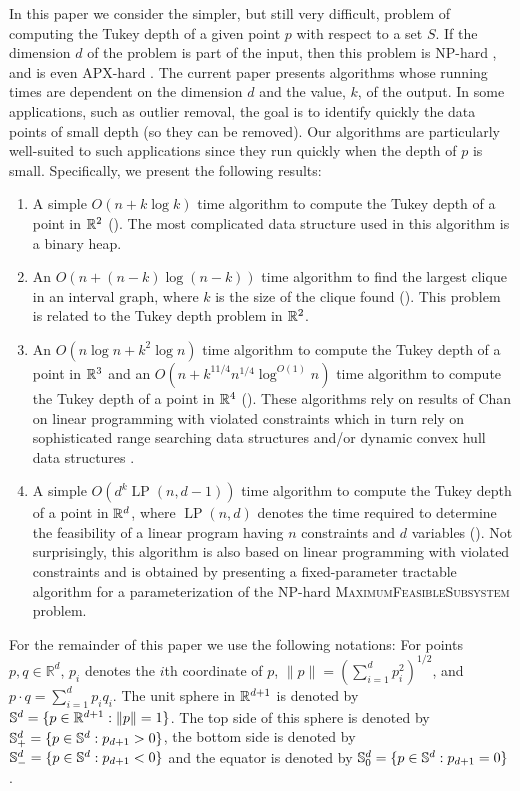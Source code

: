 \documentclass[charterfonts,lotsofwhite]{patmorin}
\DeclareMathOperator{\lp}{LP}
\begin{document}
In this paper we consider the simpler, but still very difficult,
problem of computing the Tukey depth of a given point $p$ with respect
to a set $S$. If the dimension $d$ of the problem is part of the
input, then this problem is NP-hard \cite{jp78}, and is even APX-hard
\cite{ak95}.  The current paper presents algorithms whose running
times are dependent on the dimension $d$ and the value, $k$, of the
output.  In some applications, such as outlier removal, the goal is to
identify quickly the data points of small depth (so they can be
removed).  Our algorithms are particularly well-suited to such
applications since they run quickly when the depth of $p$ is small.
Specifically, we present the following results:

\begin{enumerate}
\item A simple $O(n + k\log k)$ time algorithm to compute the Tukey
depth of a point in $\mathbb{R}^2$
().  The most complicated data structure used in this
algorithm is a binary heap.

\item An $O(n + (n-k)\log(n-k))$ time algorithm to find the largest
clique in an interval graph, where $k$ is the size of the clique found
().  This problem is related to the Tukey depth
problem in $\mathbb{R}^2$.

\item An $O(n\log n + k^2\log n)$ time algorithm to compute the Tukey
depth of a point in $\mathbb{R}^3$ and an $O(n + k^{11/4}n^{1/4}\log^{O(1)}n)$
time algorithm to compute the Tukey depth of a point in $\mathbb{R}^4$
().  These algorithms rely on results of Chan on linear
programming with violated constraints \cite{c05} which in turn rely on
sophisticated range searching data structures \cite{m92,r99} and/or
dynamic convex hull data structures \cite{bj02}.

\item A simple $O(d^k \lp(n,d-1))$ time algorithm to compute the Tukey
depth of a point in $\mathbb{R}^d$, where $\lp(n,d)$ denotes the time required
to determine the feasibility of a linear program having $n$
constraints and $d$ variables ().  Not surprisingly, this
algorithm is also based on linear programming with violated
constraints and is obtained by presenting a fixed-parameter tractable
algorithm for a parameterization of the NP-hard
\textsc{MaximumFeasibleSubsystem} problem.
\end{enumerate}

For the remainder of this paper we use the following notations: For
points $p,q\in\mathbb{R}^d$, $p_i$ denotes the $i$th coordinate of
$p$, $\|p\|=(\sum_{i=1}^d p_i^2)^{1/2}$, and $p\cdot
q=\sum_{i=1}^d p_iq_i$.  The unit sphere in $\mathbb{R}^{d+1}$ is denoted by
$\mathbb{S}^d =\{ p\in\mathbb{R}^{d+1} : \|p\|=1\}$. The top side of this sphere is
denoted by $\mathbb{S}^d_+ =\{ p\in\mathbb{S}^{d} : p_{d+1} > 0 \}$, the bottom
side is denoted by $\mathbb{S}^d_- =\{ p\in\mathbb{S}^{d} : p_{d+1} < 0 \}$ and the
equator is denoted by $\mathbb{S}^d_0 =\{ p\in\mathbb{S}^{d} : p_{d+1} = 0 \}$ .
\end{document}
